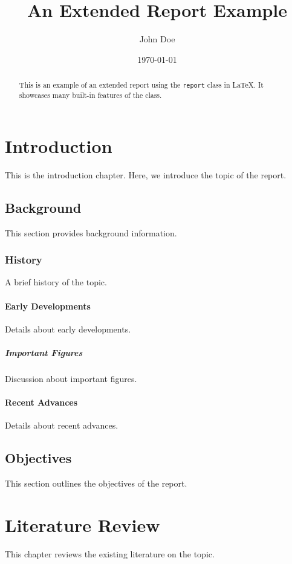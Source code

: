 \documentclass[a4paper,12pt]{report}
\title{An Extended Report Example}
\author{John Doe}
\date{\today}
\begin{document}
\maketitle

\begin{abstract}
  This is an example of an extended report using the \texttt{report} class in LaTeX. It showcases many built-in features of the class.
\end{abstract}

\tableofcontents

\chapter{Introduction}
This is the introduction chapter. Here, we introduce the topic of the report.

\section{Background}
This section provides background information.

\subsection{History}
A brief history of the topic.

\subsubsection{Early Developments}
Details about early developments.

\paragraph{Important Figures}
Discussion about important figures.

\subsubsection{Recent Advances}
Details about recent advances.

\section{Objectives}
This section outlines the objectives of the report.

\chapter{Literature Review}
This chapter reviews the existing literature on the topic.
\end{document}
